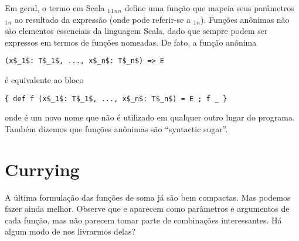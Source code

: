 Em geral, o termo em Scala 
 $_1$$_1$$_n$$_n$ 
define uma fun\c{c}\~{a}o que mapeia seus par\^{a}metros $_1$$_n$
ao resultado da express\~{a}o  (onde  pode referir-se a   
$_1$$_n$). Fun\c{c}\~{o}es an\^{o}nimas n\~{a}o s\~{a}o elementos essenciais
da linguagem Scala, dado que sempre podem ser expressos em termos de fun\c{c}\~{o}es
nomeadas. De fato, a fun\c{c}\~{a}o an\^{o}nima 

\begin{lstlisting}
(x$_1$: T$_1$, ..., x$_n$: T$_n$) => E
\end{lstlisting}
\'{e} equivalente ao bloco
\begin{lstlisting}
{ def f (x$_1$: T$_1$, ..., x$_n$: T$_n$) = E ; f _ }
\end{lstlisting}
onde  \'{e} um novo nome que n\~{a}o \'{e} utilizado em qualquer outro lugar do programa.
Tamb\'{e}m dizemos que fun\c{c}\~{o}es an\^{o}nimas s\~{a}o ``syntactic sugar''. 

 \section{Currying}



A \'{u}ltima formula\c{c}\~{a}o das fun\c{c}\~{o}es de soma j\'{a} s\~{a}o bem compactas. Mas 
podemos fazer ainda melhor. Observe que  e  aparecem como 
par\^{a}metros e argumentos de cada fun\c{c}\~{a}o, mas n\~{a}o parecem tomar parte de 
combina\c{c}\~{o}es interessantes. H\'{a} algum modo de nos livrarmos delas?

